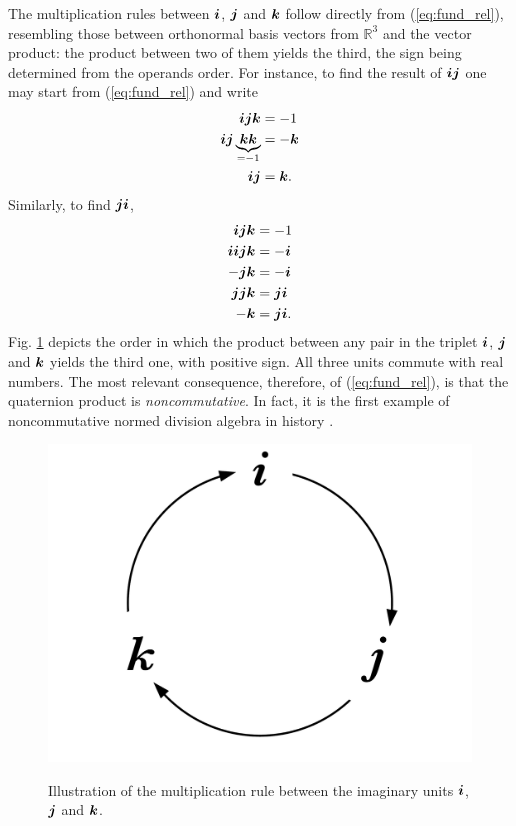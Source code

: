 The multiplication rules between  $ \boldsymbol{i} $, $ \boldsymbol{j} $ and $ \boldsymbol{k} $ follow directly from (\ref{eq:fund_rel}), resembling those between orthonormal basis vectors from $ \mathbb{R}^3 $ and the vector product: the product between two of them yields the third, the sign being determined from the operands order. For instance, to find the result of $ \boldsymbol{i} \boldsymbol{j} $ one may start from (\ref{eq:fund_rel}) and write
\begin{equation}
    \begin{aligned}
        \boldsymbol{i} \boldsymbol{j} \boldsymbol{k}                         & = -1   \\
        \boldsymbol{i} \boldsymbol{j} \underbrace{\boldsymbol{k} \boldsymbol{k}}_{= -1} & = -\boldsymbol{k} \\
        \boldsymbol{i} \boldsymbol{j}                             & = \boldsymbol{k}.
    \end{aligned}
\end{equation}
Similarly, to find $ \boldsymbol{j} \boldsymbol{i} $,
\begin{equation}
    \begin{aligned}
        \boldsymbol{i} \boldsymbol{j} \boldsymbol{k}     & = -1        \\
        \boldsymbol{i} \boldsymbol{i} \boldsymbol{j} \boldsymbol{k} & = -\boldsymbol{i}      \\
        - \boldsymbol{j} \boldsymbol{k}       & = - \boldsymbol{i}     \\
        \boldsymbol{j} \boldsymbol{j} \boldsymbol{k}     & =  \boldsymbol{j} \boldsymbol{i}  \\
        - \boldsymbol{k}           & =  \boldsymbol{j} \boldsymbol{i}. \\
    \end{aligned}
\end{equation}
Fig. \ref{fig:quatmult} depicts the order in which the product between any pair in the triplet $ \boldsymbol{i} $, $ \boldsymbol{j} $ and $ \boldsymbol{k} $ yields the third one, with positive sign. All three units commute with real numbers. The most relevant consequence, therefore, of (\ref{eq:fund_rel}), is that the quaternion product is \textit{noncommutative}. In fact, it is the first example of noncommutative normed division algebra in history \cite{kleiner2007history}.

\begin{figure}
    \centering
    \caption{Illustration of the multiplication rule between the imaginary units $ \boldsymbol{i} $, $ \boldsymbol{j} $ and $ \boldsymbol{k} $.}
    \includegraphics[width=0.2\linewidth]{Figures/quaternion_multiplication.pdf}
    \floatsource
    \label{fig:quatmult}
\end{figure}

